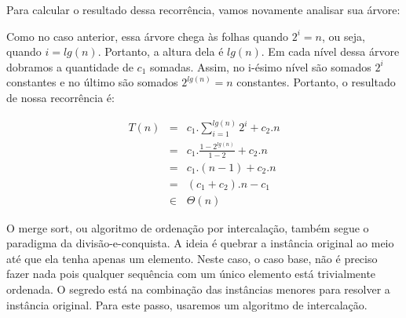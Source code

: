 Para calcular o resultado dessa recorrência, vamos novamente analisar sua árvore:

\begin{center}
\end{center}

Como no caso anterior, essa árvore chega às folhas quando $2^i = n$, ou seja, quando $i = lg(n)$.
Portanto, a altura dela é $lg(n)$.
Em cada nível dessa árvore dobramos a quantidade de $c_1$ somadas.
Assim, no i-ésimo nível são somados $2^i$ constantes e no último são somados $2^{lg(n)} = n$ constantes.
Portanto, o resultado de nossa recorrência é:

\begin{eqnarray*}
  T(n) & = & c_1.\sum_{i=1}^{lg(n)}2^i + c_2.n\\
  & = & c_1.\frac{1 - 2^{lg(n)}}{1-2} + c_2.n \\
  & = & c_1.(n-1) + c_2.n \\
  & = & (c_1 + c_2).n - c_1 \\
  & \in & \Theta(n)
\end{eqnarray*}

O merge sort, ou algoritmo de ordenação por intercalação, também segue o paradigma da divisão-e-conquista.
A ideia é quebrar a instância original ao meio até que ela tenha apenas um elemento.
Neste caso, o caso base, não é preciso fazer nada pois qualquer sequência com um único elemento está trivialmente ordenada.
O segredo está na combinação das instâncias menores para resolver a instância original.
Para este passo, usaremos um algoritmo de intercalação.

